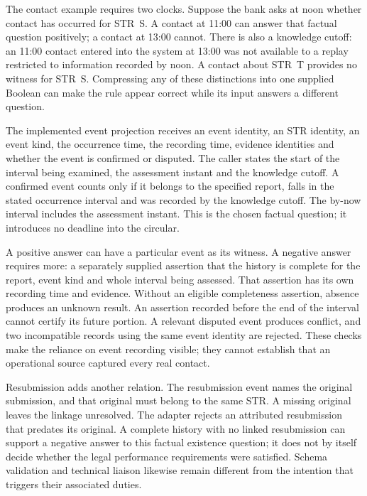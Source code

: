 \documentclass[12pt,a4paper,oneside,openany]{book}
\begin{document}
The contact example requires two clocks. Suppose the bank asks at noon whether
contact has occurred for STR~S. A contact at 11:00 can answer that factual
question positively; a contact at 13:00 cannot. There is also a knowledge
cutoff: an 11:00 contact entered into the system at 13:00 was not available to a
replay restricted to information recorded by noon. A contact about STR~T
provides no witness for STR~S. Compressing any of these distinctions into one
supplied Boolean can make the rule appear correct while its input answers a
different question.

The implemented event projection receives an event identity, an STR identity,
an event kind, the occurrence time, the recording time, evidence identities and
whether the event is confirmed or disputed. The caller states the start of the
interval being examined, the assessment instant and the knowledge cutoff. A
confirmed event counts only if it belongs to the specified report, falls in
the stated occurrence interval and was recorded by the knowledge cutoff. The
by-now interval includes the assessment instant. This is the chosen factual
question; it introduces no deadline into the circular.

A positive answer can have a particular event as its witness. A negative answer
requires more: a separately supplied assertion that the history is complete
for the report, event kind and whole interval being assessed. That assertion
has its own recording time and evidence. Without an eligible completeness
assertion, absence produces an unknown result. An assertion recorded before
the end of the interval cannot certify its future portion. A relevant disputed
event produces conflict, and two incompatible records using the same event
identity are rejected. These checks make the reliance on event recording
visible; they cannot establish that an operational source captured every real
contact.

Resubmission adds another relation. The resubmission event names the original
submission, and that original must belong to the same STR. A missing original
leaves the linkage unresolved. The adapter rejects an attributed resubmission
that predates its original. A complete history with no linked resubmission can
support a negative answer to this factual existence question; it does not by
itself decide whether the legal performance requirements were satisfied.
Schema validation and technical liaison likewise remain different from the
intention that triggers their associated duties.
\end{document}
